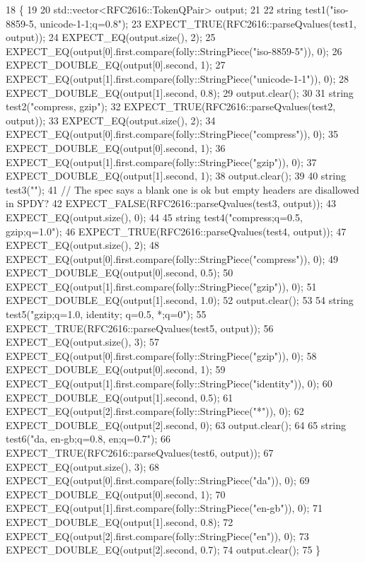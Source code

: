 \begin{DoxyCode}
18                         \{
19 
20   std::vector<RFC2616::TokenQPair> output;
21 
22   \textcolor{keywordtype}{string} test1(\textcolor{stringliteral}{"iso-8859-5, unicode-1-1;q=0.8"});
23   EXPECT\_TRUE(RFC2616::parseQvalues(test1, output));
24   EXPECT\_EQ(output.size(), 2);
25   EXPECT\_EQ(output[0].first.compare(folly::StringPiece(\textcolor{stringliteral}{"iso-8859-5"})), 0);
26   EXPECT\_DOUBLE\_EQ(output[0].second, 1);
27   EXPECT\_EQ(output[1].first.compare(folly::StringPiece(\textcolor{stringliteral}{"unicode-1-1"})), 0);
28   EXPECT\_DOUBLE\_EQ(output[1].second, 0.8);
29   output.clear();
30 
31   \textcolor{keywordtype}{string} test2(\textcolor{stringliteral}{"compress, gzip"});
32   EXPECT\_TRUE(RFC2616::parseQvalues(test2, output));
33   EXPECT\_EQ(output.size(), 2);
34   EXPECT\_EQ(output[0].first.compare(folly::StringPiece(\textcolor{stringliteral}{"compress"})), 0);
35   EXPECT\_DOUBLE\_EQ(output[0].second, 1);
36   EXPECT\_EQ(output[1].first.compare(folly::StringPiece(\textcolor{stringliteral}{"gzip"})), 0);
37   EXPECT\_DOUBLE\_EQ(output[1].second, 1);
38   output.clear();
39 
40   \textcolor{keywordtype}{string} test3(\textcolor{stringliteral}{""});
41   \textcolor{comment}{// The spec says a blank one is ok but empty headers are disallowed in SPDY?}
42   EXPECT\_FALSE(RFC2616::parseQvalues(test3, output));
43   EXPECT\_EQ(output.size(), 0);
44 
45   \textcolor{keywordtype}{string} test4(\textcolor{stringliteral}{"compress;q=0.5, gzip;q=1.0"});
46   EXPECT\_TRUE(RFC2616::parseQvalues(test4, output));
47   EXPECT\_EQ(output.size(), 2);
48   EXPECT\_EQ(output[0].first.compare(folly::StringPiece(\textcolor{stringliteral}{"compress"})), 0);
49   EXPECT\_DOUBLE\_EQ(output[0].second, 0.5);
50   EXPECT\_EQ(output[1].first.compare(folly::StringPiece(\textcolor{stringliteral}{"gzip"})), 0);
51   EXPECT\_DOUBLE\_EQ(output[1].second, 1.0);
52   output.clear();
53 
54   \textcolor{keywordtype}{string} test5(\textcolor{stringliteral}{"gzip;q=1.0, identity; q=0.5, *;q=0"});
55   EXPECT\_TRUE(RFC2616::parseQvalues(test5, output));
56   EXPECT\_EQ(output.size(), 3);
57   EXPECT\_EQ(output[0].first.compare(folly::StringPiece(\textcolor{stringliteral}{"gzip"})), 0);
58   EXPECT\_DOUBLE\_EQ(output[0].second, 1);
59   EXPECT\_EQ(output[1].first.compare(folly::StringPiece(\textcolor{stringliteral}{"identity"})), 0);
60   EXPECT\_DOUBLE\_EQ(output[1].second, 0.5);
61   EXPECT\_EQ(output[2].first.compare(folly::StringPiece(\textcolor{stringliteral}{"*"})), 0);
62   EXPECT\_DOUBLE\_EQ(output[2].second, 0);
63   output.clear();
64 
65   \textcolor{keywordtype}{string} test6(\textcolor{stringliteral}{"da, en-gb;q=0.8, en;q=0.7"});
66   EXPECT\_TRUE(RFC2616::parseQvalues(test6, output));
67   EXPECT\_EQ(output.size(), 3);
68   EXPECT\_EQ(output[0].first.compare(folly::StringPiece(\textcolor{stringliteral}{"da"})), 0);
69   EXPECT\_DOUBLE\_EQ(output[0].second, 1);
70   EXPECT\_EQ(output[1].first.compare(folly::StringPiece(\textcolor{stringliteral}{"en-gb"})), 0);
71   EXPECT\_DOUBLE\_EQ(output[1].second, 0.8);
72   EXPECT\_EQ(output[2].first.compare(folly::StringPiece(\textcolor{stringliteral}{"en"})), 0);
73   EXPECT\_DOUBLE\_EQ(output[2].second, 0.7);
74   output.clear();
75 \}
\end{DoxyCode}
